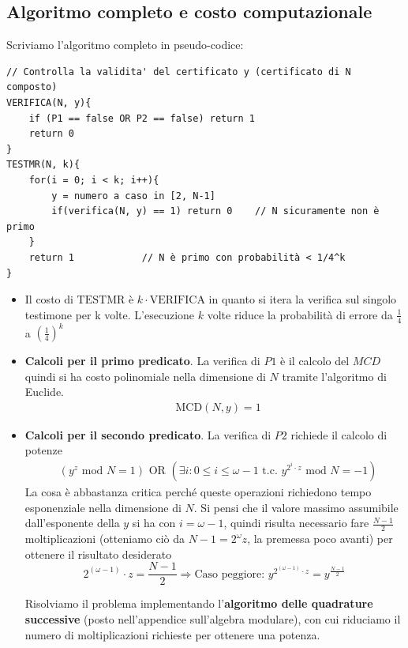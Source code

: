 \subsection{Algoritmo completo e costo computazionale} 
Scriviamo l'algoritmo completo in pseudo-codice:
\begin{verbatim}
// Controlla la validita' del certificato y (certificato di N composto)
VERIFICA(N, y){
    if (P1 == false OR P2 == false) return 1
    return 0
}
TESTMR(N, k){
    for(i = 0; i < k; i++){
        y = numero a caso in [2, N-1]
        if(verifica(N, y) == 1) return 0    // N sicuramente non è primo
    }
    return 1            // N è primo con probabilità < 1/4^k
}
\end{verbatim}
\begin{itemize}
	\item Il costo di $\text{TESTMR}$ è $k \cdot \text{VERIFICA}$ in quanto si itera la verifica sul singolo testimone per k volte. L'esecuzione $k$ volte riduce la probabilità di errore da $\frac{1}{4}$ a $\left(\frac{1}{4}\right)^k$
	\item \textbf{Calcoli per il primo predicato}. La verifica di $P1$ è il calcolo del $MCD$ quindi si ha costo polinomiale nella dimensione di $N$ tramite l'algoritmo di Euclide.
	\begin{align*}
 		\text{ } \text{MCD}(N, y) = 1
	\end{align*}
	\item \textbf{Calcoli per il secondo predicato}. La verifica di $P2$ richiede il calcolo di potenze
	\begin{align*}\text{ } \left(y^z \text{ mod } N = 1\right) \text{ OR } \left(\exists i: 0 \leq i \leq \omega - 1 \text{ t.c. } y^{2^i \cdot z} \text{ mod } N = -1\right)
	\end{align*}
	La cosa è abbastanza critica perché queste operazioni richiedono tempo esponenziale nella dimensione di $N$. Si pensi che il valore massimo assumibile dall'esponente della $y$ si ha con $i=\omega - 1$, quindi risulta necessario fare $\frac{N-1}{2}$ moltiplicazioni (otteniamo ciò da $N-1=2^\omega z$, la premessa poco avanti) per ottenere il risultato desiderato \[2^{(\omega-1)} \cdot z=\frac{N-1}{2} \Longrightarrow \text{Caso peggiore: } y^{2^{(\omega-1)} \cdot z} = y^{\frac{N-1}{2}} \]
	
	Risolviamo il problema implementando l'\textbf{algoritmo delle quadrature successive} (posto nell'appendice sull'algebra modulare), con cui riduciamo il numero di moltiplicazioni richieste per ottenere una potenza.
\end{itemize}

